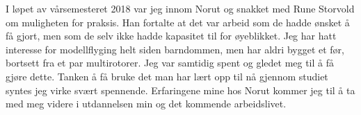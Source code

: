 \documentclass[12pt, a4paper]{article}
\begin{document}
I løpet av vårsemesteret 2018 var jeg innom Norut og snakket med Rune Storvold om muligheten for praksis. Han fortalte at det var arbeid som de hadde ønsket å få gjort, men som de selv ikke hadde kapasitet til for øyeblikket. Jeg har hatt interesse for modellflyging helt siden barndommen, men har aldri bygget et før, bortsett fra et par multirotorer. Jeg var samtidig spent og gledet meg til å få gjøre dette. Tanken å få bruke det man har lært opp til nå gjennom studiet syntes jeg virke svært spennende. Erfaringene mine hos Norut kommer jeg til å ta med meg videre i utdannelsen min og det kommende arbeidslivet. 







\end{document}
